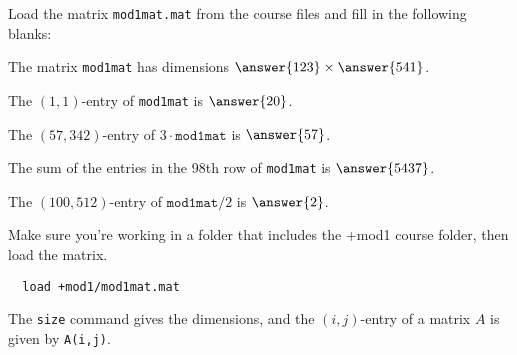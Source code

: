 \documentclass{ximera}
\author{Zack Reed}
\begin{document}
  
\begin{exercise}

  Load the matrix \texttt{mod1mat.mat} from the course files and fill in the following blanks:
  
  \item The matrix \texttt{mod1mat} has dimensions $\answer{123}\times \answer{541}$.
  \item The $(1,1)$-entry of \texttt{mod1mat} is $\answer{20}$.
  \item The $(57,342)$-entry of $3\cdot\texttt{mod1mat}$ is $\answer{57}$.
  \item The sum of the entries in the 98th row of \texttt{mod1mat} is $\answer{5437}$.
  \item The $(100,512)$-entry of $\texttt{mod1mat}/2$ is $\answer{2}$.
  
  \begin{hint}
  
    Make sure you're working in a folder that includes the +mod1 course folder, then load the matrix.
\begin{verbatim}
  load +mod1/mod1mat.mat
\end{verbatim}

The \texttt{size} command gives the dimensions, and the $(i,j)$-entry of a matrix $A$ is given by \texttt{A(i,j)}.

\end{hint}

\end{exercise}
\end{document}
